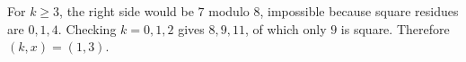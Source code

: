 For $k\ge3$, the right side would be $7$ modulo $8$, impossible because square residues are $0,1,4$. Checking $k=0,1,2$ gives $8,9,11$, of which only $9$ is square. Therefore $\boxed{(k,x)=(1,3)}$.
